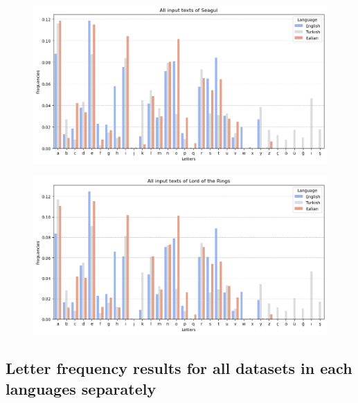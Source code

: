 \begin{figure}[h]
    \centering
    \includegraphics[width=1\textwidth]{media/allSeagul.png}
\end{figure}

\begin{figure}[h]
    \centering
    \includegraphics[width=1\textwidth]{media/allLordOfTheRings.png}
\end{figure}

\newpage

\subsection*{Letter frequency results for all datasets in each languages separately} 

